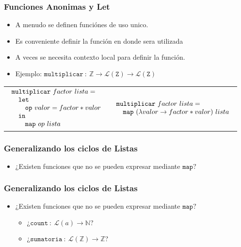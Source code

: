 \documentclass{beamer}
\begin{document}
\begin{frame}
    \frametitle{Funciones Anonimas y Let}
    \begin{itemize}
        \item{A menudo se definen funci\'ones de uso
        unico.}
        \item{Es conveniente definir la funci\'on en
        donde sera utilizada}
        \item{A veces se necesita contexto local para
        definir la funci\'on.}
        \item{Ejemplo: $\mathtt{multiplicar}\ :\ \mathbb{Z}\rightarrow \mathcal{L}(\mathtt{Z})
        \rightarrow \mathcal{L}(\mathtt{Z})$}
    \end{itemize}
    \begin{tabular}{l l}
        $
        \begin{array}{l l l}
            \multicolumn{3}{l}{\mathtt{multiplicar}\ factor\ lista=} \\
            & \multicolumn{2}{l}{\mathtt{let}} \\
            & & \mathtt{op}\ valor=factor*valor \\
            & \multicolumn{2}{l}{\mathtt{in}} \\
            & & \mathtt{map}\ op\ lista
        \end{array}
        $
        &
        $
        \begin{array}{l l}
            \multicolumn{2}{l}{\mathtt{multiplicar}\ factor\ lista=} \\
            & \mathtt{map}\ (\lambda valor\rightarrow factor*valor)\ lista
        \end{array}
        $
        \\
    \end{tabular}
\end{frame}

\begin{frame}
    \frametitle{Generalizando los ciclos de Listas}
    \begin{itemize}
        \item{¿Existen funciones que no se pueden expresar mediante $\mathtt{map}?$}
    \end{itemize}
\end{frame}

\begin{frame}
    \frametitle{Generalizando los ciclos de Listas}
    \begin{itemize}
        \item{¿Existen funciones que no se pueden expresar mediante $\mathtt{map}?$
        \begin{itemize}
            \item{¿$\mathtt{count}\ :\ \mathcal{L}(a)\rightarrow \mathbb{N}$?}
            \item{¿$\mathtt{sumatoria}\ :\ \mathcal{L}(\mathbb{Z})\rightarrow \mathbb{Z}$?}
        \end{itemize}
        }
    \end{itemize}
\end{frame}
\end{document}
